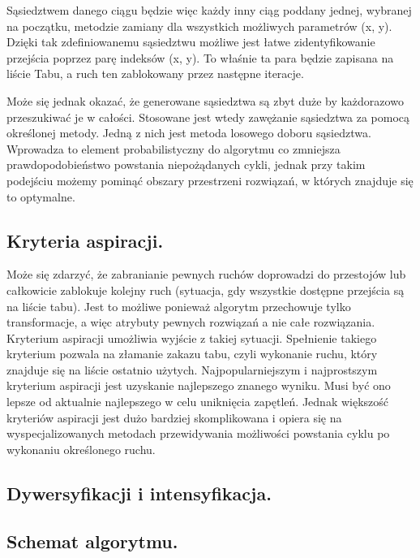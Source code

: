 Sąsiedztwem danego ciągu będzie więc każdy inny ciąg poddany jednej, wybranej na początku, metodzie zamiany dla wszystkich możliwych parametrów (x, y). Dzięki tak zdefiniowanemu sąsiedztwu możliwe jest łatwe zidentyfikowanie przejścia poprzez parę indeksów (x, y). To właśnie ta para będzie zapisana na liście Tabu, a ruch ten zablokowany przez następne iteracje.

Może się jednak okazać, że generowane sąsiedztwa są zbyt duże by każdorazowo przeszukiwać je w całości. Stosowane jest wtedy zawężanie sąsiedztwa za pomocą określonej metody. Jedną z nich jest metoda losowego doboru sąsiedztwa. Wprowadza to element probabilistyczny do algorytmu co zmniejsza prawdopodobieństwo powstania niepożądanych cykli, jednak przy takim podejściu możemy pominąć obszary przestrzeni rozwiązań, w których znajduje się to optymalne.

\subsection{Kryteria aspiracji.}

Może się zdarzyć, że zabranianie pewnych ruchów doprowadzi do przestojów lub całkowicie zablokuje kolejny ruch (sytuacja, gdy wszystkie dostępne przejścia są na liście tabu). Jest to możliwe ponieważ algorytm przechowuje tylko transformacje, a więc atrybuty pewnych rozwiązań a nie całe rozwiązania. Kryterium aspiracji umożliwia wyjście z takiej sytuacji.
Spełnienie takiego kryterium  pozwala na złamanie zakazu tabu, czyli wykonanie ruchu, który znajduje się na liście ostatnio użytych. Najpopularniejszym i najprostszym kryterium aspiracji jest uzyskanie najlepszego znanego wyniku. Musi być ono lepsze od aktualnie najlepszego w celu uniknięcia zapętleń. Jednak większość kryteriów aspiracji jest dużo bardziej skomplikowana i opiera się na wyspecjalizowanych metodach przewidywania możliwości powstania cyklu po wykonaniu określonego ruchu.

\subsection{Dywersyfikacji i intensyfikacja.}
\subsection{Schemat algorytmu.}
